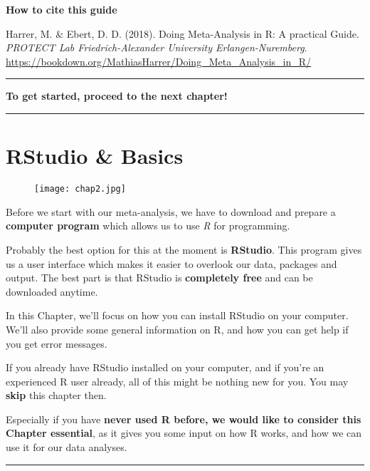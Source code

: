 \documentclass[]{book}
\theoremstyle{definition}
\theoremstyle{definition}
\theoremstyle{definition}
\theoremstyle{remark}
\begin{document}
\textbf{How to cite this guide}

Harrer, M. \& Ebert, D. D. (2018). Doing Meta-Analysis in R: A practical
Guide. \emph{PROTECT Lab Friedrich-Alexander University
Erlangen-Nuremberg}.
\url{https://bookdown.org/MathiasHarrer/Doing_Meta_Analysis_in_R/}

\begin{center}\rule{0.5\linewidth}{\linethickness}\end{center}

\textbf{To get started, proceed to the next chapter!}

\begin{center}\rule{0.5\linewidth}{\linethickness}\end{center}

\chapter{RStudio \& Basics}\label{rstudio-basics}

\begin{figure}
\centering
\texttt{[image: chap2.jpg]}
\caption{}
\end{figure}

\begin{rmdinfo}
Before we start with our meta-analysis, we have to download and prepare
a \textbf{computer program} which allows us to use \emph{R} for
programming.

Probably the best option for this at the moment is \textbf{RStudio}.
This program gives us a user interface which makes it easier to overlook
our data, packages and output. The best part is that RStudio is
\textbf{completely free} and can be downloaded anytime.

In this Chapter, we'll focus on how you can install RStudio on your
computer. We'll also provide some general information on R, and how you
can get help if you get error messages.

If you already have RStudio installed on your computer, and if you're an
experienced R user already, all of this might be nothing new for you.
You may \textbf{skip} this chapter then.

Especially if you have \textbf{never used R before, we would like to
consider this Chapter essential}, as it gives you some input on how R
works, and how we can use it for our data analyses.
\end{rmdinfo}

\begin{center}\rule{0.5\linewidth}{\linethickness}\end{center}
\end{document}
